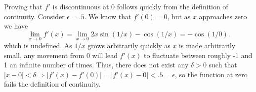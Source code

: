 \documentclass[12pt,leqno]{article}
\begin{document}
\indent Proving that $f'$ is discontinuous at 0 follows quickly from the definition of continuity. Consider $\epsilon =.5$. We know that $f'(0) = 0$, but as $x$ approaches zero we have 
$$\lim_{x \rightarrow 0} f'(x) = \lim_ {x\rightarrow 0} 2x \sin(1/x) - \cos(1/x) = -\cos(1/0).$$ 
which is undefined. As $1/x$ grows arbitrarily quickly as $x$ is made arbitrarily small, any movement from 0 will lead $f'(x)$ to fluctuate between roughly -1 and 1 an infinite number of times. Thus, there does not exist any $\delta>0$ such that $|x-0|<\delta \Rightarrow |f'(x) - f'(0)| = |f'(x) - 0| < .5 = \epsilon$, so the function at zero fails the definition of continuity. 
\end{document}
